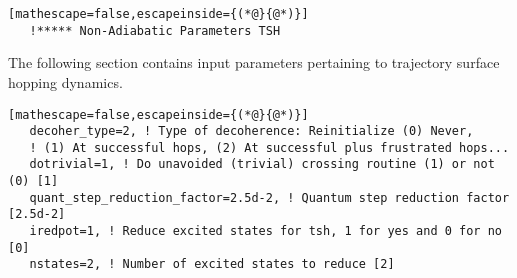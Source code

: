 \begin{lstlisting}[mathescape=false,escapeinside={(*@}{@*)}]
   !***** Non-Adiabatic Parameters TSH
\end{lstlisting}
\noindent The following section contains input parameters pertaining to trajectory surface hopping dynamics.
\begin{lstlisting}[mathescape=false,escapeinside={(*@}{@*)}]
   decoher_type=2, ! Type of decoherence: Reinitialize (0) Never, 
   ! (1) At successful hops, (2) At successful plus frustrated hops... 
   dotrivial=1, ! Do unavoided (trivial) crossing routine (1) or not (0) [1]
   quant_step_reduction_factor=2.5d-2, ! Quantum step reduction factor [2.5d-2]
   iredpot=1, ! Reduce excited states for tsh, 1 for yes and 0 for no [0]
   nstates=2, ! Number of excited states to reduce [2]
\end{lstlisting}
